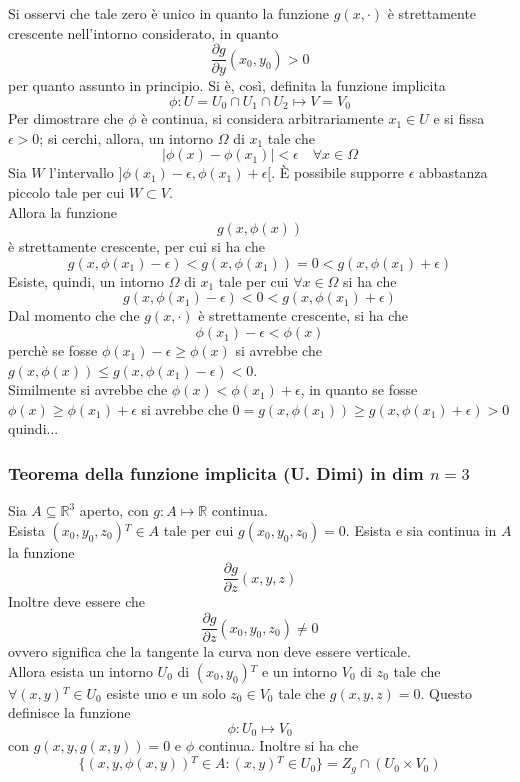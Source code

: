 \documentclass[a4paper]{extarticle}
\begin{document}
Si osservi che tale zero è unico in quanto la funzione $g(x,\cdot)$ è strettamente crescente nell'intorno considerato, in quanto
\[\dfrac{\partial g}{\partial y}(x_0,y_0) > 0\]
per quanto assunto in principio. Si è, così, definita la funzione implicita
\[\phi : U = U_0 \cap U_1 \cap U_2 \longmapsto V = V_0\]
Per dimostrare che $\phi$ è continua, si considera arbitrariamente $x_1 \in U$ e si fissa $\epsilon>0$; si cerchi, allora, un intorno $\Omega$ di $x_1$ tale che
\[\left \vert \phi(x) - \phi(x_1) \right \vert < \epsilon \hspace{1em} \forall x \in \Omega\]
Sia $W$ l'intervallo $]\phi(x_1)-\epsilon,\phi(x_1)+\epsilon[$. È possibile supporre $\epsilon$ abbastanza piccolo tale per cui $W \subset V$.\\
Allora la funzione
\[g(x,\phi(x))\]
è strettamente crescente, per cui si ha che
\[g(x,\phi(x_1) - \epsilon) < g(x,\phi(x_1)) = 0 < g(x,\phi(x_1)+\epsilon)\]
Esiste, quindi, un intorno $\Omega$ di $x_1$ tale per cui $\forall x \in \Omega$ si ha che
\[g(x,\phi(x_1)-\epsilon) < 0 < g(x,\phi(x_1)+\epsilon)\]
Dal momento che che $g(x,\cdot)$ è strettamente crescente, si ha che
\[\phi(x_1)-\epsilon<\phi(x)\]
perchè se fosse $\phi(x_1) - \epsilon \geq \phi(x)$ si avrebbe che $g(x,\phi(x)) \leq g(x,\phi(x_1)-\epsilon) < 0$.\\
Similmente si avrebbe che $\phi(x) < \phi(x_1) + \epsilon$, in quanto se fosse $\phi(x) \geq \phi(x_1) + \epsilon$ si avrebbe che $0=g(x,\phi(x_1)) \geq g(x,\phi(x_1)+\epsilon) > 0$
quindi...

\vspace{1em}
\subsubsection{Teorema della funzione implicita (U. Dimi) in dim $n=3$}
Sia $A \subseteq \mathbb{R}^3$ aperto, con $g : A \longmapsto \mathbb{R}$ continua.\\
Esista $(x_0,y_0,z_0){^T} \in A$ tale per cui $g(x_0,y_0,z_0) = 0$. Esista e sia continua in $A$ la funzione
\[\dfrac{\partial g}{\partial z} (x,y,z)\]
Inoltre deve essere che
\[\dfrac{\partial g}{\partial z}(x_0,y_0,z_0) \neq 0\]
ovvero significa che la tangente la curva non deve essere verticale.\\
Allora esista un intorno $U_0$ di $(x_0,y_0){^T}$ e un intorno $V_0$ di $z_0$ tale che $\forall (x,y){^T} \in U_0$ esiste uno e un solo $z_0 \in V_0$ tale che $g(x,y,z) = 0$. Questo definisce la funzione
\[\phi : U_0 \longmapsto V_0\]
con $g(x,y,g(x,y)) = 0$ e $\phi$ continua. Inoltre si ha che
\[\{(x,y,\phi(x,y)){^T} \in A : (x,y){^T} \in U_0\} = Z_g \cap (U_0 \times V_0)\]
\end{document}
